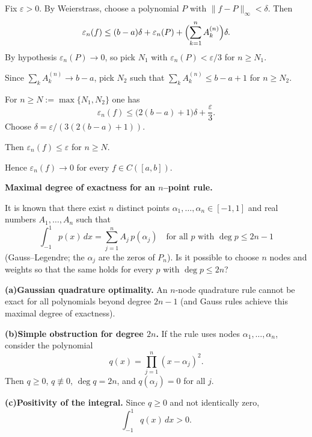 \begin{solution}
Fix $\varepsilon>0$.
	By Weierstrass, choose a polynomial $P$ with $\|f-P\|_\infty<\delta$. Then
	\[
	\varepsilon_n(f)\le (b-a)\delta+\varepsilon_n(P)+\Bigl(\sum_{k=1}^n A_k^{(n)}\Bigr)\delta .
	\]
	By hypothesis $\varepsilon_n(P)\to 0$, so pick $N_1$ with $\varepsilon_n(P)<\varepsilon/3$ for $n\ge N_1$.

	Since $\sum_k A_k^{(n)}\to b-a$, pick $N_2$ such that $\sum_k A_k^{(n)}\le b-a+1$ for $n\ge N_2$.

	For $n\ge N:=\max\{N_1,N_2\}$ one has
	\[
	\varepsilon_n(f)\le \bigl(2(b-a)+1\bigr)\delta+\frac{\varepsilon}{3}.
	\]
	Choose $\delta=\varepsilon\big/(3(2(b-a)+1))$.

	Then $\varepsilon_n(f)\le \varepsilon$ for $n\ge N$.

	Hence $\varepsilon_n(f)\to 0$ for every $f\in C([a,b])$.
\end{solution}

\begin{problem}[CP-II-0197]
\label{prob:cp-ii-0197}
\textbf{Maximal degree of exactness for an $n$--point rule.}

\hspace*{1.5em}It is known that there exist $n$ distinct points $\alpha_1,\dots,\alpha_n\in[-1,1]$ and real numbers
	$A_1,\dots,A_n$ such that
	\[
	\int_{-1}^{1} p(x)\,dx=\sum_{j=1}^n A_j\,p(\alpha_j)
	\quad\text{for all } p \text{ with } \deg p\le 2n-1
	\]
	(Gauss--Legendre; the $\alpha_j$ are the zeros of $P_n$).
	Is it possible to choose $n$ nodes and weights so that the same holds for every $p$ with $\deg p\le 2n$?

	\smallskip

	 \setlength{\itemsep}{1em}

		\par\smallskip\noindent\textbf{(a)}\quad \textbf{Gaussian quadrature optimality.}
		An $n$-node quadrature rule cannot be exact for all polynomials beyond degree $2n-1$
		(and Gauss rules achieve this maximal degree of exactness).

		\par\smallskip\noindent\textbf{(b)}\quad \textbf{Simple obstruction for degree $2n$.}
		If the rule uses nodes $\alpha_1,\dots,\alpha_n$, consider the polynomial
		\[
		q(x)=\prod_{j=1}^{n}(x-\alpha_j)^2 .
		\]
		Then $q\ge 0$, $q\not\equiv 0$, $\deg q=2n$, and $q(\alpha_j)=0$ for all $j$.

		\par\smallskip\noindent\textbf{(c)}\quad \textbf{Positivity of the integral.}
		Since $q\ge 0$ and not identically zero,
		\[
		\int_{-1}^{1} q(x)\,dx > 0 .
		\]
\end{problem}

